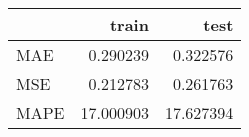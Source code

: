 \begin{tabular}{lrr}
\toprule
{} &      train &       test \\
\midrule
MAE  &   0.290239 &   0.322576 \\
MSE  &   0.212783 &   0.261763 \\
MAPE &  17.000903 &  17.627394 \\
\bottomrule
\end{tabular}
